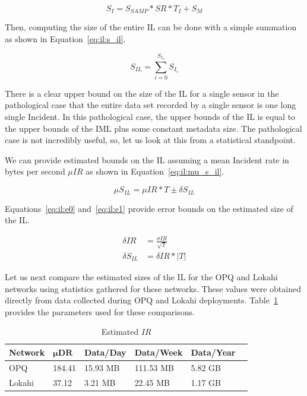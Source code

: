 \begin{equation}\label{eq:il:s_i}
	S_{I} = S_{SAMP} * SR * T_{I} + S_{M}
\end{equation}

Then, computing the size of the entire IL can be done with a simple summation as shown in Equation~\ref{eq:il:s_il}.

\begin{equation}\label{eq:il:s_il}
	S_{IL} = \sum_{i=0}^{S_{I_{n}}} S_{I_{i}}
\end{equation}

There is a clear upper bound on the size of the IL for a single sensor in the pathological case that the entire data set recorded by a single sensor is one long single Incident. In this pathological case, the upper bounds of the IL is equal to the upper bounds of the IML plus some constant metadata size. The pathological case is not incredibly useful, so, let us look at this from a statistical standpoint.

We can provide estimated bounds on the IL assuming a mean Incident rate in bytes per second $\mu IR$ as shown in Equation~\ref{eq:il:mu_s_il}.

\begin{equation}\label{eq:il:mu_s_il}
 \mu S_{IL} = \mu IR * T \pm \delta S_{IL}
\end{equation}

Equations~\ref{eq:il:e0} and~\ref{eq:il:e1} provide error bounds on the estimated size of the IL\@.

\begin{align}
	\delta IR &= \frac{\sigma IR}{\sqrt{T}} \label{eq:il:e0} \\
	\delta S_{IL} &= \delta IR * |T| \label{eq:il:e1}
\end{align}

Let us next compare the estimated sizes of the IL for the OPQ and Lokahi networks using statistics gathered for these networks. These values were obtained directly from data collected during OPQ and Lokahi deployments. Table~\ref{table:estimated_mu_ir} provides the parameters used for these comparisons.

\begin{table}[H]
	\centering
	\caption{Estimated $IR$}
	\begin{tabularx}{\textwidth}{llllll}
		\toprule
		\textbf{Network} & $\bm{\mu DR}$ & \textbf{Data/Day} & \textbf{Data/Week} & \textbf{Data/Year} \\
		\midrule
		OPQ & 184.41 & 15.93 MB & 111.53 MB & 5.82 GB \\
		Lokahi & 37.12 & 3.21 MB & 22.45 MB & 1.17 GB \\
		\bottomrule
	\end{tabularx}
	\label{table:estimated_mu_ir}
\end{table}

